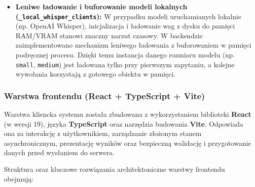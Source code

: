 \begin{itemize}
    \item \textbf{Leniwe ładowanie i buforowanie modeli lokalnych (\texttt{\_local\_whisper\_clients}):}
    W przypadku modeli uruchamianych lokalnie (np. OpenAI Whisper), inicjalizacja i ładowanie wag z dysku do pamięci RAM/VRAM stanowi znaczny narzut czasowy. W backendzie zaimplementowano mechanizm leniwego ładowania z buforowaniem w pamięci podręcznej procesu. Dzięki temu instancja danego rozmiaru modelu (np. \texttt{small}, \texttt{medium}) jest ładowana tylko przy pierwszym zapytaniu, a kolejne wywołania korzystają z gotowego obiektu w pamięci.
\end{itemize}

\subsubsection{Warstwa frontendu (React + TypeScript + Vite)}
\label{subsubsec:frontend_layer}

Warstwa kliencka systemu została zbudowana z wykorzystaniem biblioteki \textbf{React} (w wersji 19), języka \textbf{TypeScript} oraz narzędzia budowania \textbf{Vite}. Odpowiada ona za interakcję z użytkownikiem, zarządzanie złożonym stanem asynchronicznym, prezentację wyników oraz bezpieczną walidację i przygotowanie danych przed wysłaniem do serwera.

Struktura oraz kluczowe rozwiązania architektoniczne warstwy frontendu obejmują:

